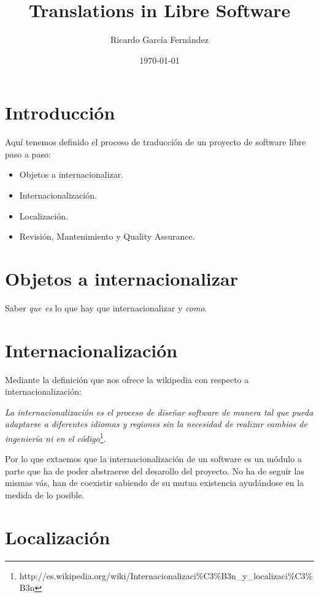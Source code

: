 \documentclass[11pt]{article}
\title{\textbf{Translations in Libre Software}}
\author{Ricardo Garc\'ia Fern\'andez}
\date{\today}
\begin{document}
\maketitle

\section{Introducci\'on}

\par Aqu\'i tenemos definido el proceso de traducci\'on de un proyecto de software libre paso a paso:
\begin{itemize}
    \item Objetos a internacionalizar.
    \item Internacionalizaci\'on.
    \item Localizaci\'on.
    \item Revisi\'on, Mantenimiento y Quality Assurance.
\end{itemize}

\section{Objetos a internacionalizar}

Saber \emph{que es} lo que hay que internacionalizar y \emph{como}.

\section{Internacionalizaci\'on}

\par Mediante la definici\'on que nos ofrece la wikipedia con respecto a internacionalizaci\'on:

\emph{La internacionalizaci\'on es el proceso de dise\~nar software de manera tal que pueda adaptarse a diferentes idiomas y regiones sin la necesidad de realizar cambios de ingenier\'ia ni en el c\'odigo}\footnote{http://es.wikipedia.org/wiki/Internacionalizaci\%C3\%B3n\_y\_localizaci\%C3\%B3n}.

\par Por lo que extaemos que la internacionalizaci\'on de un software es un m\'odulo a parte que ha de poder abstraerse del desarollo del proyecto. No ha de seguir las mismas v\'as, han de coexistir sabiendo de su mutua existencia ayud\'andose en la medida de lo posible.

\section{Localizaci\'on}
\end{document}
